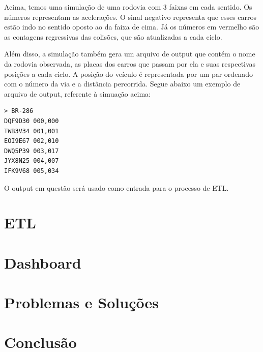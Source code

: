 \documentclass{article}
\begin{document}
    Acima, temos uma simulação de uma rodovia com 3 faixas em cada sentido. Os números representam
    as acelerações. O sinal negativo representa que esses carros estão indo no sentido oposto ao
    da faixa de cima. Já os números em vermelho são as contagens regressivas das colisões, que são
    atualizadas a cada ciclo.

    Além disso, a simulação também gera um arquivo de output que contém o nome da rodovia observada,
    as placas dos carros que passam por ela e suas respectivas posições a cada ciclo. A posição do
    veículo é representada por um par ordenado com o número da via e a distância percorrida.
    Segue abaixo um exemplo de arquivo de output, referente à simuação acima:

    \begin{verbatim}
> BR-286
DQF9D30 000,000
TWB3V34 001,001
EOI9E67 002,010
DWQ5P39 003,017
JYX8N25 004,007
IFK9V68 005,034
    \end{verbatim}

    O output em questão será usado como entrada para o processo de ETL.

    \section{ETL}

    \section{Dashboard}

    \section{Problemas e Soluções}

    \section{Conclusão}
\end{document}
